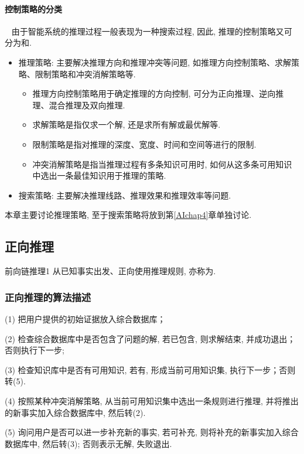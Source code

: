 \paragraph{控制策略的分类}~{}
由于智能系统的推理过程一般表现为一种搜索过程, 因此, 推理的控制策略又可分为和.
\begin{itemize}
\item 推理策略: 主要解决推理方向和推理冲突等问题, 如推理方向控制策略、求解策略、限制策略和冲突消解策略等.
    \begin{itemize}
    \item 推理方向控制策略用于确定推理的方向控制, 可分为正向推理、逆向推理、混合推理及双向推理.
    \item 求解策略是指仅求一个解, 还是求所有解或最优解等.
    \item 限制策略是指对推理的深度、宽度、时间和空间等进行的限制.
    \item 冲突消解策略是指当推理过程有多条知识可用时, 如何从这多条可用知识中选出一条最佳知识用于推理的策略.
    \end{itemize}
\item 搜索策略: 主要解决推理线路、推理效果和推理效率等问题.
\end{itemize}
本章主要讨论推理策略, 至于搜索策略将放到第\ref{AIchap4}章单独讨论.
\subsection{正向推理}
\begin{mydef}{前向链推理}{1}
从已知事实出发、正向使用推理规则, 亦称为.
\end{mydef}
\subsubsection{正向推理的算法描述}

(1) 把用户提供的初始证据放入综合数据库；

(2) 检查综合数据库中是否包含了问题的解, 若已包含, 则求解结束, 并成功退出；否则执行下一步;

(3) 检查知识库中是否有可用知识, 若有, 形成当前可用知识集, 执行下一步；否则转(5).

(4) 按照某种冲突消解策略, 从当前可用知识集中选出一条规则进行推理, 并将推出的新事实加入综合数据库中, 然后转(2).

(5) 询问用户是否可以进一步补充新的事实, 若可补充, 则将补充的新事实加入综合数据库中, 然后转(3); 否则表示无解, 失败退出.

